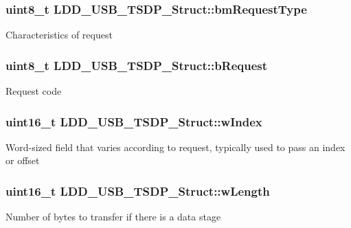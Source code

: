 \subsubsection[{bm\+Request\+Type}]{\setlength{\rightskip}{0pt plus 5cm}uint8\+\_\+t L\+D\+D\+\_\+\+U\+S\+B\+\_\+\+T\+S\+D\+P\+\_\+\+Struct\+::bm\+Request\+Type}\label{struct_l_d_d___u_s_b___t_s_d_p___struct_afddb7f5f46fc265c07889888d1307a79}
Characteristics of request \hypertarget{struct_l_d_d___u_s_b___t_s_d_p___struct_a38ea083d899a28927d0de58dd646054f}{}
\subsubsection[{b\+Request}]{\setlength{\rightskip}{0pt plus 5cm}uint8\+\_\+t L\+D\+D\+\_\+\+U\+S\+B\+\_\+\+T\+S\+D\+P\+\_\+\+Struct\+::b\+Request}\label{struct_l_d_d___u_s_b___t_s_d_p___struct_a38ea083d899a28927d0de58dd646054f}
Request code \hypertarget{struct_l_d_d___u_s_b___t_s_d_p___struct_af04dcae50f0c8d6b27bd1e70f1af89d6}{}
\subsubsection[{w\+Index}]{\setlength{\rightskip}{0pt plus 5cm}uint16\+\_\+t L\+D\+D\+\_\+\+U\+S\+B\+\_\+\+T\+S\+D\+P\+\_\+\+Struct\+::w\+Index}\label{struct_l_d_d___u_s_b___t_s_d_p___struct_af04dcae50f0c8d6b27bd1e70f1af89d6}
Word-\/sized field that varies according to request, typically used to pass an index or offset \hypertarget{struct_l_d_d___u_s_b___t_s_d_p___struct_a9015bd09ca306fdb49943219fafe3fe3}{}
\subsubsection[{w\+Length}]{\setlength{\rightskip}{0pt plus 5cm}uint16\+\_\+t L\+D\+D\+\_\+\+U\+S\+B\+\_\+\+T\+S\+D\+P\+\_\+\+Struct\+::w\+Length}\label{struct_l_d_d___u_s_b___t_s_d_p___struct_a9015bd09ca306fdb49943219fafe3fe3}
Number of bytes to transfer if there is a data stage \hypertarget{struct_l_d_d___u_s_b___t_s_d_p___struct_abe97822a1a8976f53da5a43b8db8cfd3}{}
